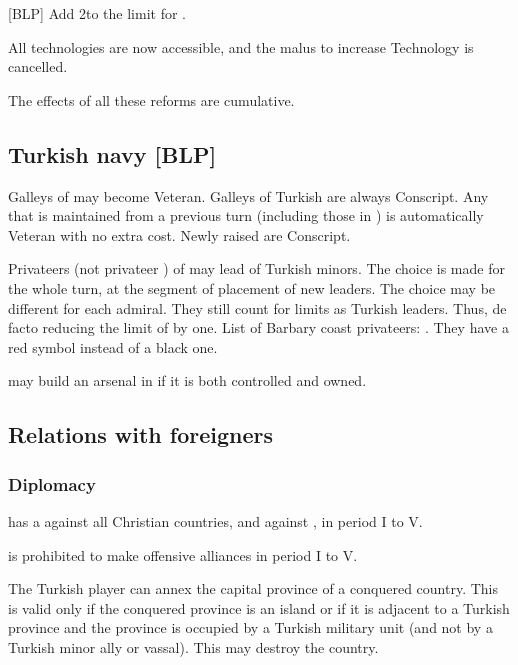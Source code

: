 [BLP] Add 2\LeaderG to the limit for \TUR.

All technologies are now accessible, and the malus to increase
Technology is cancelled.

\aparag The effects of all these reforms are cumulative.

\subsection{Turkish navy [BLP]}
\aparag Galleys of \TUR may become Veteran. Galleys of Turkish \VASSAL
are always Conscript.
\bparag Any \NGD that is maintained from a previous turn (including
those in \FLEET) is automatically Veteran with no extra cost.
\bparag Newly raised \NGD are Conscript.

 Privateers \LeaderA (not privateer
\LeaderE) of \TUR may lead \corsaire of Turkish minors.
\bparag The choice is made for the whole turn, at the segment of
placement of new leaders. The choice may be different for each
admiral.
\bparag They still count for limits as Turkish leaders. Thus, de facto
reducing the limit of \LeaderA by one.
\bparag List of Barbary coast privateers:
. They have a red symbol instead
of a black one.

 \TUR may build an arsenal in
\provinceMalta if it is both controlled and owned.

\subsection{Relations with foreigners}
\subsubsection{Diplomacy}
\aparag \TUR has a \CB against all Christian countries, and against
, in period I to V.

\aparag \TUR is prohibited to make offensive alliances in period I to V.

 The Turkish player can annex the capital
province of a conquered country. This is valid only if the conquered
province is an island or if it is adjacent to a Turkish province
%
%
and the province is occupied by a Turkish military unit (and not by a
Turkish minor ally or vassal). This may destroy the country.

